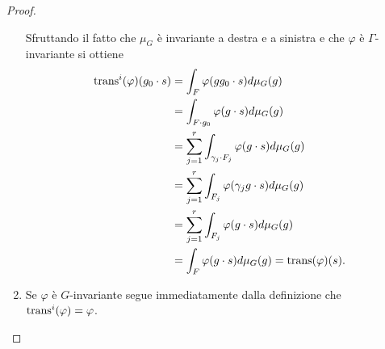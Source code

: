 \begin{proof}
\begin{enumerate}
Sfruttando il fatto che $\mu_G$ è invariante a destra e a sinistra e che $\varphi$ è $\Gamma$-invariante si ottiene
\begin{align*}
\operatorname{trans}^i(\varphi)(g_0\cdot s)&=\int_F\varphi(gg_0\cdot s)d\mu_G(g)\\
&=\int_{F\cdot g_0}\varphi(g\cdot s)d\mu_G(g)\\
&=\sum_{j=1}^r\int_{\gamma_j\cdot F_j}\varphi(g\cdot s)d\mu_G(g)\\
&=\sum_{j=1}^r\int_{F_j}\varphi(\gamma_jg\cdot s)d\mu_G(g)\\
&=\sum_{j=1}^r\int_{F_j}\varphi(g\cdot s)d\mu_G(g)\\
&=\int_F\varphi(g\cdot s)d\mu_G(g)=\operatorname{trans}(\varphi)(s).
\end{align*}
\item Se $\varphi$ è $G$-invariante segue immediatamente dalla definizione che $\operatorname{trans}^i(\varphi)=\varphi$.
\end{enumerate}
\end{proof}